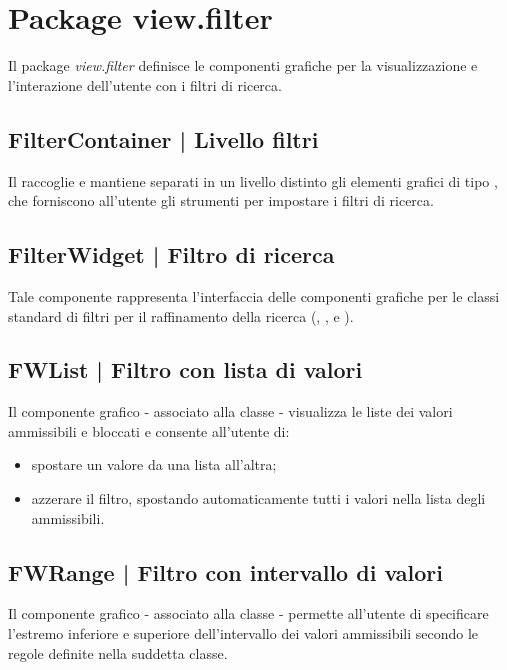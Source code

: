 \documentclass[10pt,a4paper,headinclude,footinclude,hidelinks]{scrreprt} %
\begin{document}
	\section{Package view.filter}
	\label{sec:stage:design:view.filter}
	Il package \textit{view.filter} definisce le componenti grafiche per la visualizzazione e l'interazione dell'utente con i filtri di ricerca.

	\subsection[FilterContainer]{FilterContainer | Livello filtri}
	\label{sec:stage:design:view.filter:filter-container}
	Il \textit{} raccoglie e mantiene separati in un livello distinto gli elementi grafici di tipo \textit{}, che forniscono all'utente gli strumenti per impostare i filtri di ricerca.

	\subsection[FilterWidget]{FilterWidget | Filtro di ricerca}
	\label{sec:stage:design:view.filter:filter}
	Tale componente rappresenta l'interfaccia delle componenti grafiche per le classi standard di filtri per il raffinamento della ricerca (\textit{}, \textit{}, \textit{} e \textit{}).

	\subsection[FWList]{FWList | Filtro con lista di valori}
	\label{sec:stage:design:view.filter:list-filter}
	Il componente grafico - associato alla classe \textit{} - visualizza le liste dei valori ammissibili e bloccati e consente all'utente di:
	\begin{itemize}
	\item spostare un valore da una lista all'altra;
	\item azzerare il filtro, spostando automaticamente tutti i valori nella lista degli ammissibili.
	\end{itemize}

	\subsection[FWRange]{FWRange | Filtro con intervallo di valori}
	\label{sec:stage:design:view.filter:range-filter}
	Il componente grafico - associato alla classe \textit{} - permette all'utente di specificare l'estremo inferiore e superiore dell'intervallo dei valori ammissibili secondo le regole definite nella suddetta classe.
\end{document}
